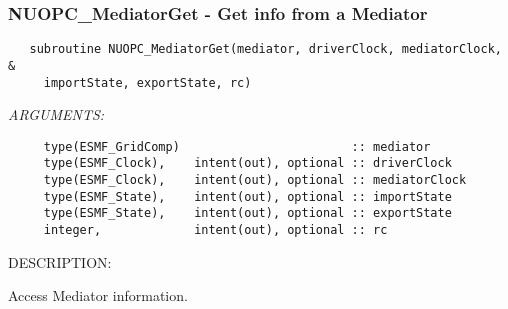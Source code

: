  
\setlength{\oldparskip}{\parskip}
\setlength{\parskip}{1.5ex}
\setlength{\oldparindent}{\parindent}
\setlength{\parindent}{0pt}
\setlength{\oldbaselineskip}{\baselineskip}
\setlength{\baselineskip}{11pt}
 
\def\bv{\begin{verbatim}}
\def\ev{\end{verbatim}}
\def\be{\begin{equation}}
\def\ee{\end{equation}}
\def\bea{\begin{eqnarray}}
\def\eea{\end{eqnarray}}
\def\bi{\begin{itemize}}
\def\ei{\end{itemize}}
\def\bn{\begin{enumerate}}
\def\en{\end{enumerate}}
\def\bd{\begin{description}}
\def\ed{\end{description}}
\def\({\left (}
\def\){\right )}
\def\[{\left [}
\def\]{\right ]}
\def\<{\left  \langle}
\def\>{\right \rangle}
\def\cI{{\cal I}}
\def\diag{\mathop{\rm diag}}
\def\tr{\mathop{\rm tr}}


 
\subsubsection [NUOPC\_MediatorGet] {NUOPC\_MediatorGet - Get info from a Mediator}


  
\begin{verbatim}   subroutine NUOPC_MediatorGet(mediator, driverClock, mediatorClock, &
     importState, exportState, rc)\end{verbatim}{\em ARGUMENTS:}
\begin{verbatim}     type(ESMF_GridComp)                        :: mediator
     type(ESMF_Clock),    intent(out), optional :: driverClock
     type(ESMF_Clock),    intent(out), optional :: mediatorClock
     type(ESMF_State),    intent(out), optional :: importState
     type(ESMF_State),    intent(out), optional :: exportState
     integer,             intent(out), optional :: rc\end{verbatim}
{\sf DESCRIPTION:\\ }


     Access Mediator information.
\setlength{\parskip}{\oldparskip}
\setlength{\parindent}{\oldparindent}
\setlength{\baselineskip}{\oldbaselineskip}
